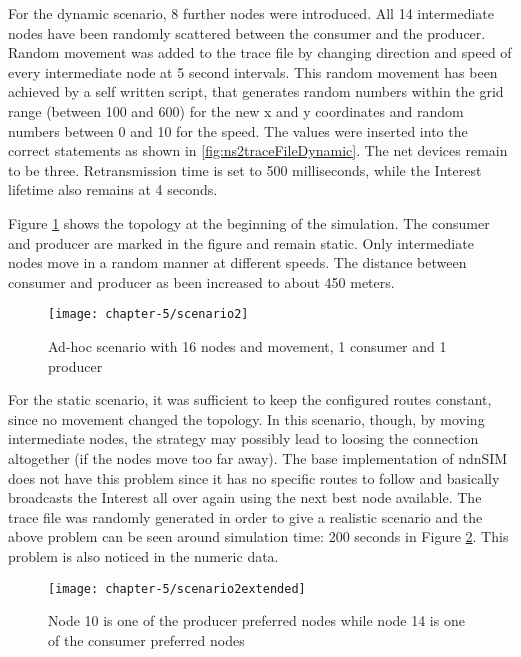For the dynamic scenario, 8 further nodes were introduced. All 14 intermediate nodes have been randomly scattered between the consumer and the producer. Random movement was added to the trace file by changing direction and speed of every intermediate node at 5 second intervals. This random movement has been achieved by a self written script, that generates random numbers within the grid range (between 100 and 600) for the new x and y coordinates and random numbers between 0 and 10 for the speed. The values were inserted into the correct statements as shown in \ref{fig:ns2traceFileDynamic}. The net devices remain to be three. Retransmission time is set to 500 milliseconds, while the Interest lifetime also remains at 4 seconds. 

Figure \ref{fig:scenario2} shows the topology at the beginning of the simulation. The consumer and producer are marked in the figure and remain static. Only intermediate nodes move in a random manner at different speeds. The distance between consumer and producer as been increased to about 450 meters.

\vspace{5mm} %

\begin{figure}[H]
  \centering
  \texttt{[image: chapter-5/scenario2]}
  \caption{Ad-hoc scenario with 16 nodes and movement, 1 consumer and 1 producer}
  \label{fig:scenario2}
\end{figure}

\vspace{5mm} %

For the static scenario, it was sufficient to keep the configured routes constant, since no movement changed the topology. In this scenario, though, by moving intermediate nodes, the strategy may possibly lead to loosing the connection altogether (if the nodes move too far away). The base implementation of ndnSIM does not have this problem since it has no specific routes to follow and basically broadcasts the Interest all over again using the next best node available. The trace file was randomly generated in order to give a realistic scenario and the above problem can be seen around simulation time: 200 seconds in Figure \ref{fig:scenario2extended}. This problem is also noticed in the numeric data.

\vspace{5mm} %

\begin{figure}[H]
  \centering
  \texttt{[image: chapter-5/scenario2extended]}
  \caption{Node 10 is one of the producer preferred nodes while node 14 is one of the consumer preferred nodes}
  \label{fig:scenario2extended}
\end{figure}

